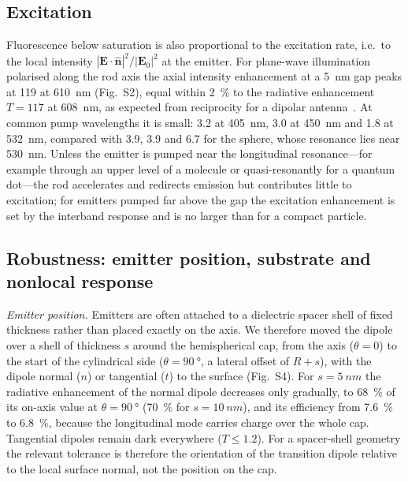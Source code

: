 \documentclass[11pt,a4paper]{article}
\begin{document}
\subsection{Excitation}
Fluorescence below saturation is also proportional to the excitation rate, i.e.\ to the local intensity
$|\mathbf E\cdot\hat{\mathbf n}|^2/|\mathbf E_0|^2$ at the emitter. For plane-wave illumination polarised along the
rod axis the axial intensity enhancement at a \SI{5}{nm} gap peaks at 119 at \SI{610}{nm}
(Fig.~S2), equal within \SI{2}{\percent} to the radiative enhancement $T=117$ at \SI{608}{nm}, as expected from
reciprocity for a dipolar antenna~\cite{novotny,bharadwaj2009}. At common pump wavelengths it is small: 3.2 at
\SI{405}{nm}, 3.0 at \SI{450}{nm} and 1.8 at \SI{532}{nm}, compared with 3.9, 3.9 and 6.7 for the sphere, whose
resonance lies near \SI{530}{nm}. Unless the emitter is pumped near the longitudinal resonance---for example through
an upper level of a molecule or quasi-resonantly for a quantum dot---the rod accelerates and redirects emission but
contributes little to excitation; for emitters pumped far above the gap the excitation enhancement is set by the
interband response and is no larger than for a compact particle.

\subsection{Robustness: emitter position, substrate and nonlocal response}
\emph{Emitter position.} Emitters are often attached to a dielectric spacer shell of fixed thickness rather than
placed exactly on the axis. We therefore moved the dipole over a shell of thickness $s$ around the hemispherical cap,
from the axis ($\theta=0$) to the start of the cylindrical side ($\theta=\SI{90}{\degree}$, a lateral offset of
$R+s$), with the dipole normal ($n$) or tangential ($t$) to the surface (Fig.~S4). For $s=\SI{5}{nm}$
the radiative enhancement of the normal dipole decreases only gradually, to \SI{68}{\percent} of its on-axis value at
$\theta=\SI{90}{\degree}$ (\SI{70}{\percent} for $s=\SI{10}{nm}$), and its efficiency from \SI{7.6}{\percent} to
\SI{6.8}{\percent}, because the longitudinal mode carries charge over the whole cap. Tangential dipoles remain dark
everywhere ($T\leq1.2$). For a spacer-shell geometry the relevant tolerance is therefore the orientation of the
transition dipole relative to the local surface normal, not the position on the cap.
\end{document}
